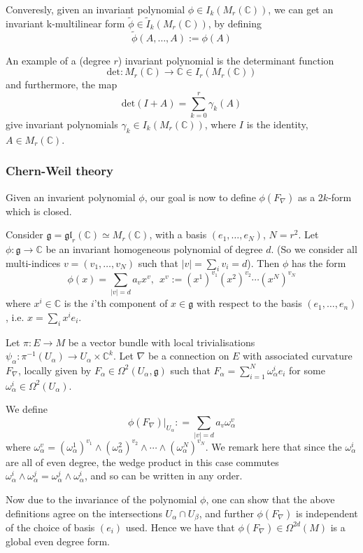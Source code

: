 \documentclass[a4paper]{article}
\theoremstyle{definition} \newtheorem*{definition}{Definition}
\theoremstyle{definition} \newtheorem*{definitions}{Definitions}
\theoremstyle{plain} \newtheorem{theorem}{Theorem}[section]
\theoremstyle{plain} \newtheorem{proposition}[theorem]{Proposition}
\theoremstyle{plain} \newtheorem{corollary}[theorem]{Corollary}
\theoremstyle{plain} \newtheorem{lemma}[theorem]{Lemma}
\theoremstyle{plain} \newtheorem{example}[theorem]{Example}
\newcommand{\complexnos}{\mathbb{C}}
\begin{document}
Converesly, given an invariant polynomial $\phi \in I_k(M_r(\complexnos))$, we can get an invariant k-multilinear form $\tilde{\phi} \in \tilde{I}_k(M_r(\complexnos))$, by defining
$$\tilde{\phi}(A, \ldots, A):=\phi(A)$$

An example of a (degree $r$) invariant polynomial is the determinant function
$$\text{det}:M_r(\complexnos)\to \complexnos \in I_r(M_r(\complexnos))$$
and furthermore, the map
$$\text{det}(I+A)=\sum_{k=0}^r \gamma_k(A) $$
give invariant polynomials $\gamma_k\in I_k(M_r(\complexnos))$, where $I$ is the identity, $A \in M_r(\complexnos)$.

\subsubsection{Chern-Weil theory}
Given an invarient polynomial $\phi$, our goal is now to define $\phi(F_\nabla)$ as a $2k$-form which is closed. 

Consider $\mathfrak{g}=\mathfrak{gl}_r(\complexnos)\simeq M_r(\complexnos)$, with a basis $(e_1, \ldots, e_N)$, $N=r^2$. Let $\phi:\mathfrak{g}\to \complexnos$ be an invariant homogeneous polynomial of degree $d$. (So we consider all multi-indices $v=(v_1, \ldots, v_N)$ such that $|v|=\sum_i v_i = d$). Then $\phi$ has the form 
$$\phi(x)=\sum_{|v|=d} a_v x^v, \ \ x^v := (x^1)^{v_1}(x^2)^{v_2}\cdots (x^N)^{v_N}$$
where $x^i\in \complexnos$ is the $i$'th component of $x\in \mathfrak{g}$ with respect to the basis $(e_1, \ldots, e_n)$, i.e. $x=\sum_i x^i e_i$. 

Let $\pi:E\to M$ be a vector bundle with local trivialisations 
$\psi_\alpha:\pi^{-1}(U_\alpha)\to U_\alpha \times \complexnos^k$. Let $\nabla$ be a connection on $E$ with associated curvature $F_\nabla$, locally given by $F_\alpha \in \Omega^2(U_\alpha, \mathfrak{g})$ such that 
$F_\alpha = \sum_{i=1}^N \omega^i_\alpha e_i$
for some $\omega^i_\alpha\in \Omega^2(U_\alpha)$. 

We define
$$\phi(F_\nabla)|_{U_\alpha} : = \sum_{|v|=d} a_v\omega^v_\alpha$$
where $\omega^v_\alpha = (\omega^1_\alpha)^{v_1} \wedge (\omega^2_\alpha)^{v_2} \wedge \cdots \wedge (\omega^N_\alpha)^{v_N} $. 
We remark here that since the $\omega^i_\alpha$ are all of even degree, the wedge product in this case commutes $\omega^i_\alpha \wedge \omega^j_\alpha = \omega^j_\alpha \wedge \omega^i_\alpha$, and so can be written in any order.

Now due to the invariance of the polynomial $\phi$, one can show that the above definitions agree on the intersections $U_\alpha\cap U_\beta$, and further $\phi(F_\nabla)$ is independent of the choice of basis $(e_i)$ used. Hence we have that $\phi(F_\nabla)\in \Omega^{2d}(M)$ is a global even degree form. 
\end{document}
